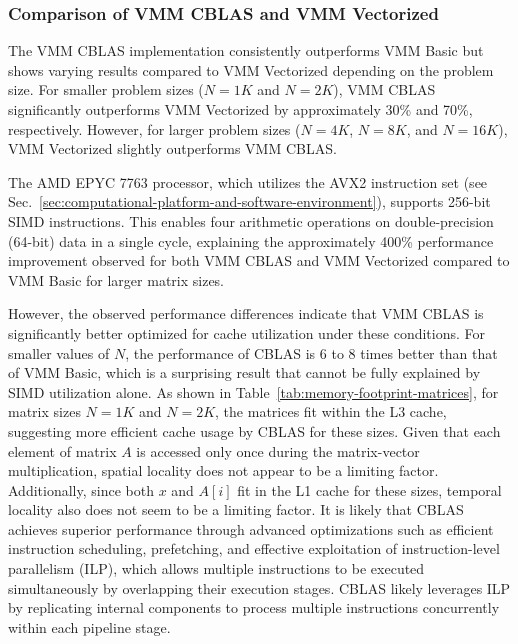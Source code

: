 \subsubsection{Comparison of VMM CBLAS and VMM Vectorized}
\label{subsubsec:comparison-cblas-vectorized}
The VMM CBLAS implementation consistently outperforms VMM Basic but shows varying results compared to VMM Vectorized depending on the problem size. For smaller problem sizes (\(N = 1K\) and \(N = 2K\)), VMM CBLAS significantly outperforms VMM Vectorized by approximately 30\% and 70\%, respectively. However, for larger problem sizes (\(N = 4K\), \(N = 8K\), and \(N = 16K\)), VMM Vectorized slightly outperforms VMM CBLAS.

The AMD EPYC 7763 processor, which utilizes the AVX2 instruction set (see Sec.~\ref{sec:computational-platform-and-software-environment}), supports 256-bit SIMD instructions. This enables four arithmetic operations on double-precision (64-bit) data in a single cycle, explaining the approximately 400\% performance improvement observed for both VMM CBLAS and VMM Vectorized compared to VMM Basic for larger matrix sizes.

However, the observed performance differences indicate that VMM CBLAS is significantly better optimized for cache utilization under these conditions. For smaller values of \(N\), the performance of CBLAS is 6 to 8 times better than that of VMM Basic, which is a surprising result that cannot be fully explained by SIMD utilization alone. As shown in Table~\ref{tab:memory-footprint-matrices}, for matrix sizes \(N = 1K\) and \(N = 2K\), the matrices fit within the L3 cache, suggesting more efficient cache usage by CBLAS for these sizes. Given that each element of matrix \(A\) is accessed only once during the matrix-vector multiplication, spatial locality does not appear to be a limiting factor. Additionally, since both \(x\) and \(A[i]\) fit in the L1 cache for these sizes, temporal locality also does not seem to be a limiting factor. It is likely that CBLAS achieves superior performance through advanced optimizations such as efficient instruction scheduling, prefetching, and effective exploitation of instruction-level parallelism (ILP), which allows multiple instructions to be executed simultaneously by overlapping their execution stages. CBLAS likely leverages ILP by replicating internal components to process multiple instructions concurrently within each pipeline stage.


